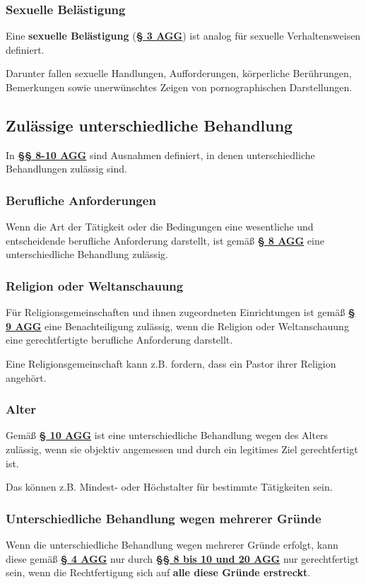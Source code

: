 \documentclass[12pt,A4]{extarticle}
\newcommand{\highlight}[1]{\textcolor{highlightColor}{\textbf{#1}}}
\newcommand{\agG}[2][]{\textbf{\textcolor{gesetzLink}{\href{https://www.gesetze-im-internet.de/agg/__#2.html}{§ #2 \ifthenelse{\equal{#1}{}}{}{#1 }AGG}}}}
\newcommand{\agGG}[2][]{\textbf{\textcolor{gesetzLink}{\href{https://www.gesetze-im-internet.de/agg/__#2.html}{§§ #1 AGG}}}}
\begin{document}
\subsubsection{Sexuelle Belästigung}
Eine \highlight{sexuelle Belästigung} (\agG[Abs. 4]{3}) ist analog für sexuelle Verhaltensweisen definiert.\par
Darunter fallen sexuelle Handlungen, Aufforderungen, körperliche Berührungen, Bemerkungen sowie unerwünschtes Zeigen von pornographischen Darstellungen.

\subsection{Zulässige unterschiedliche Behandlung}
In \agGG[8-10]{8} sind Ausnahmen definiert, in denen unterschiedliche Behandlungen zulässig sind.

\subsubsection{Berufliche Anforderungen}
Wenn die Art der Tätigkeit oder die Bedingungen eine wesentliche und entscheidende berufliche Anforderung darstellt, ist gemäß \agG{8} eine unterschiedliche Behandlung zulässig.

\subsubsection{Religion oder Weltanschauung}
Für Religionsgemeinschaften und ihnen zugeordneten Einrichtungen ist gemäß \agG{9} eine Benachteiligung zulässig, wenn die Religion oder Weltanschauung eine gerechtfertigte berufliche Anforderung darstellt.\par
Eine Religionsgemeinschaft kann z.B. fordern, dass ein Pastor ihrer Religion angehört.

\subsubsection{Alter}
Gemäß \agG{10} ist eine unterschiedliche Behandlung wegen des Alters zulässig, wenn sie objektiv angemessen und durch ein legitimes Ziel gerechtfertigt ist.\par
Das können z.B. Mindest- oder Höchstalter für bestimmte Tätigkeiten sein.

\subsubsection{Unterschiedliche Behandlung wegen mehrerer Gründe}
Wenn die unterschiedliche Behandlung wegen mehrerer Gründe erfolgt, kann diese gemäß \agG{4} nur durch \agGG[8 bis 10 und 20]{8} nur gerechtfertigt sein, wenn die Rechtfertigung sich auf \textbf{alle diese Gründe erstreckt}.
\end{document}
